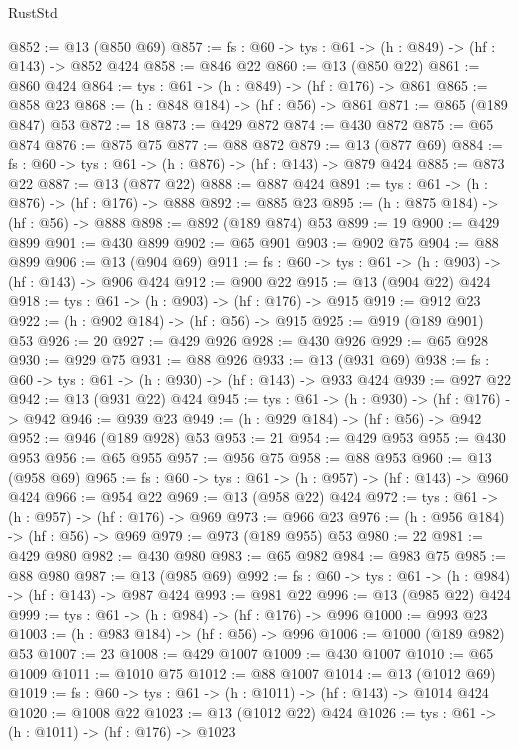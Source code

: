\begin{lexlean}{RustStd}
\begin{coremodule}
@852 := @13 (@850 @69)
@857 := {fs : @60} -> {tys : @61} -> (h : @849) -> (hf : @143) -> @852 @424
@858 := @846 @22
@860 := @13 (@850 @22)
@861 := @860 @424
@864 := {tys : @61} -> (h : @849) -> (hf : @176) -> @861
@865 := @858 @23
@868 := (h : @848 @184) -> (hf : @56) -> @861
@871 := @865 (@189 @847) @53
@872 := 18
@873 := @429 @872
@874 := @430 @872
@875 := @65 @874
@876 := @875 @75
@877 := @88 @872
@879 := @13 (@877 @69)
@884 := {fs : @60} -> {tys : @61} -> (h : @876) -> (hf : @143) -> @879 @424
@885 := @873 @22
@887 := @13 (@877 @22)
@888 := @887 @424
@891 := {tys : @61} -> (h : @876) -> (hf : @176) -> @888
@892 := @885 @23
@895 := (h : @875 @184) -> (hf : @56) -> @888
@898 := @892 (@189 @874) @53
@899 := 19
@900 := @429 @899
@901 := @430 @899
@902 := @65 @901
@903 := @902 @75
@904 := @88 @899
@906 := @13 (@904 @69)
@911 := {fs : @60} -> {tys : @61} -> (h : @903) -> (hf : @143) -> @906 @424
@912 := @900 @22
@915 := @13 (@904 @22) @424
@918 := {tys : @61} -> (h : @903) -> (hf : @176) -> @915
@919 := @912 @23
@922 := (h : @902 @184) -> (hf : @56) -> @915
@925 := @919 (@189 @901) @53
@926 := 20
@927 := @429 @926
@928 := @430 @926
@929 := @65 @928
@930 := @929 @75
@931 := @88 @926
@933 := @13 (@931 @69)
@938 := {fs : @60} -> {tys : @61} -> (h : @930) -> (hf : @143) -> @933 @424
@939 := @927 @22
@942 := @13 (@931 @22) @424
@945 := {tys : @61} -> (h : @930) -> (hf : @176) -> @942
@946 := @939 @23
@949 := (h : @929 @184) -> (hf : @56) -> @942
@952 := @946 (@189 @928) @53
@953 := 21
@954 := @429 @953
@955 := @430 @953
@956 := @65 @955
@957 := @956 @75
@958 := @88 @953
@960 := @13 (@958 @69)
@965 := {fs : @60} -> {tys : @61} -> (h : @957) -> (hf : @143) -> @960 @424
@966 := @954 @22
@969 := @13 (@958 @22) @424
@972 := {tys : @61} -> (h : @957) -> (hf : @176) -> @969
@973 := @966 @23
@976 := (h : @956 @184) -> (hf : @56) -> @969
@979 := @973 (@189 @955) @53
@980 := 22
@981 := @429 @980
@982 := @430 @980
@983 := @65 @982
@984 := @983 @75
@985 := @88 @980
@987 := @13 (@985 @69)
@992 := {fs : @60} -> {tys : @61} -> (h : @984) -> (hf : @143) -> @987 @424
@993 := @981 @22
@996 := @13 (@985 @22) @424
@999 := {tys : @61} -> (h : @984) -> (hf : @176) -> @996
@1000 := @993 @23
@1003 := (h : @983 @184) -> (hf : @56) -> @996
@1006 := @1000 (@189 @982) @53
@1007 := 23
@1008 := @429 @1007
@1009 := @430 @1007
@1010 := @65 @1009
@1011 := @1010 @75
@1012 := @88 @1007
@1014 := @13 (@1012 @69)
@1019 := {fs : @60} -> {tys : @61} -> (h : @1011) -> (hf : @143) -> @1014 @424
@1020 := @1008 @22
@1023 := @13 (@1012 @22) @424
@1026 := {tys : @61} -> (h : @1011) -> (hf : @176) -> @1023

\end{coremodule}
\end{lexlean}
